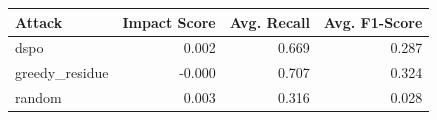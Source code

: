 \begin{tabular}{lrrr}
\toprule
Attack & Impact Score & Avg. Recall & Avg. F1-Score \\
\midrule
dspo & 0.002 & 0.669 & 0.287 \\
greedy_residue & -0.000 & 0.707 & 0.324 \\
random & 0.003 & 0.316 & 0.028 \\
\bottomrule
\end{tabular}
